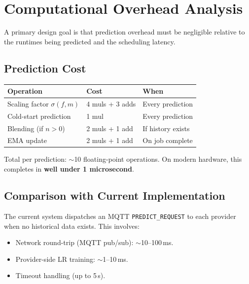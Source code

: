 \documentclass[11pt, a4paper]{article}
\newcommand{\bluecontentbegin}{\begingroup\color{blue!70!black}}
\begin{document}
\section{Computational Overhead Analysis}
\label{sec:overhead}
\bluecontentbegin

A primary design goal is that prediction overhead must be negligible
relative to the runtimes being predicted and the scheduling latency.

\subsection{Prediction Cost}

\begin{center}
\small
\begin{tabular}{@{}lll@{}}
    \toprule
    Operation & Cost & When \\
    \midrule
    Scaling factor $\sigma(f,m)$ & 4 muls + 3 adds & Every prediction \\
    Cold-start prediction & 1 mul & Every prediction \\
    Blending (if $n > 0$) & 2 muls + 1 add & If history exists \\
    EMA update & 2 muls + 1 add & On job complete \\
    \bottomrule
\end{tabular}
\end{center}

Total per prediction: $\sim$10 floating-point operations. On modern
hardware, this completes in \textbf{well under 1 microsecond}.

\subsection{Comparison with Current Implementation}

The current system dispatches an MQTT \texttt{PREDICT\_REQUEST} to
each provider when no historical data exists. This involves:
\begin{itemize}
    \item Network round-trip (MQTT pub/sub): $\sim$10--100\,ms.
    \item Provider-side LR training: $\sim$1--10\,ms.
    \item Timeout handling (up to 5\,s).
\end{itemize}
\end{document}
